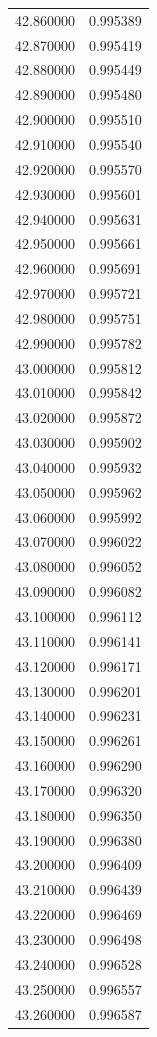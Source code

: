\begin{tabular}{rr}
42.860000 & 0.995389 \\
42.870000 & 0.995419 \\
42.880000 & 0.995449 \\
42.890000 & 0.995480 \\
42.900000 & 0.995510 \\
42.910000 & 0.995540 \\
42.920000 & 0.995570 \\
42.930000 & 0.995601 \\
42.940000 & 0.995631 \\
42.950000 & 0.995661 \\
42.960000 & 0.995691 \\
42.970000 & 0.995721 \\
42.980000 & 0.995751 \\
42.990000 & 0.995782 \\
43.000000 & 0.995812 \\
43.010000 & 0.995842 \\
43.020000 & 0.995872 \\
43.030000 & 0.995902 \\
43.040000 & 0.995932 \\
43.050000 & 0.995962 \\
43.060000 & 0.995992 \\
43.070000 & 0.996022 \\
43.080000 & 0.996052 \\
43.090000 & 0.996082 \\
43.100000 & 0.996112 \\
43.110000 & 0.996141 \\
43.120000 & 0.996171 \\
43.130000 & 0.996201 \\
43.140000 & 0.996231 \\
43.150000 & 0.996261 \\
43.160000 & 0.996290 \\
43.170000 & 0.996320 \\
43.180000 & 0.996350 \\
43.190000 & 0.996380 \\
43.200000 & 0.996409 \\
43.210000 & 0.996439 \\
43.220000 & 0.996469 \\
43.230000 & 0.996498 \\
43.240000 & 0.996528 \\
43.250000 & 0.996557 \\
43.260000 & 0.996587 \\

\end{tabular}
